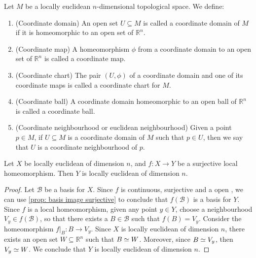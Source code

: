 \begin{definition}[Miscelaneous]
  Let \(M\) be a locally euclidean \(n\)-dimensional topological space. We
  define:
  \begin{enumerate}[(C1)]
    \item\label{def: coordinate domain}
      (Coordinate domain) An open set \(U \subseteq M\) is called a coordinate
      domain of \(M\) if it is homeomorphic to an open set of \(\mathbb{R}^n\).
    \item\label{def: coordinate map}
      (Coordinate map) A homeomorphism \(\phi\) from a coordinate domain to an
      open set of \(\mathbb{R}^n\) is called a coordinate map.
    \item\label{def: coordinate chart}
      (Coordinate chart) The pair \((U, \phi)\) of a coordinate domain and one
      of its coordinate maps is called a coordinate chart for \(M\).
    \item\label{def: coordinate ball}
      (Coordinate ball) A coordinate domain homeomorphic to an open ball of
      \(\mathbb{R}^n\) is called a coordinate ball.
    \item\label{def: euclidean neighbourhood}
      (Coordinate neighbourhood or euclidean neighbourhood) Given a point \(p
      \in M\), if \(U \subseteq M\) is a coordinate domain of \(M\) such that
      \(p \in U\), then we say that \(U\) is a coordinate neighbourhood of
      \(p\).
  \end{enumerate}
\end{definition}

\begin{proposition}
  Let \(X\) be locally euclidean of dimension \(n\), and \(f: X \to Y\) be a
  surjective local homeomorphism. Then \(Y\) is locally euclidean of dimension
  \(n\).
\end{proposition}

\begin{proof}
  Let \(\mathcal B\) be a basis for \(X\). Since \(f\) is continuous, surjective
  and a open , we can use \cref{prop: basis image
  surjective} to conclude that \(f(\mathcal B)\) is a basis for \(Y\). Since
  \(f\) is a local homeomorphism, given any point \(y \in Y\), choose a
  neighbourhood \(V_y \in f(\mathcal B)\), so that there exists a \(B \in
  \mathcal B\) such that \(f(B) = V_y\). Consider the homeomorphism \(f|_B: B
  \to V_y\). Since \(X\) is locally euclidean of dimension \(n\), there exists
  an open set \(W \subseteq \mathbb{R}^n\) such that \(B \simeq W\). Moreover,
  since \(B \simeq V_y\), then \(V_y \simeq W\). We conclude that \(Y\) is locally
  euclidean of dimension \(n\).
\end{proof}

